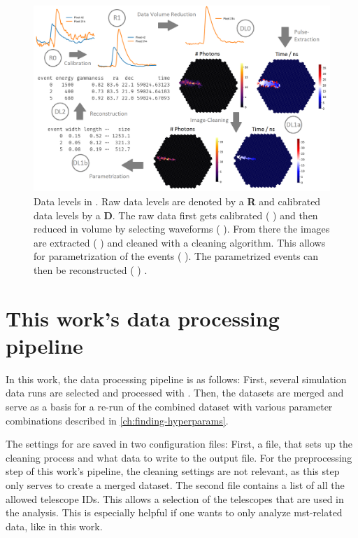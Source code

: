 \begin{figure}
    \centering
    \includegraphics[width=\textwidth]{graphics/ctapipe.png}
    \caption{Data levels in \ctapipe{}. Raw data levels are denoted by a \textbf{R} and calibrated
    data levels by a \textbf{D}. The raw data first gets calibrated (\rzero{} \rightarrow \rone{})
    and then reduced in volume by selecting waveforms (\rone{} \rightarrow \dlz{}). From there the
    images are extracted (\dlz{} \rightarrow \dloa{}) and cleaned with a cleaning algorithm. This
    allows for parametrization of the events (\dloa{} \rightarrow \dlob{}). The parametrized events
    can then be reconstructed (\dlob{} \rightarrow \dlt{}) \cite{noethe_thesis, hackfeld}.}
    \label{fig:ctapipe}
\end{figure}

\section{This work's data processing pipeline}
\label{sec:pipeline}
In this work, the data processing pipeline is as follows: First, several simulation data runs are
selected and processed with \ctapipe{}. Then, the datasets are merged and serve as a basis for a re-run
of the combined dataset with various parameter combinations described in \autoref{ch:finding-hyperparams}.

The settings for \ctapipe{} are saved in two configuration files: First, a file, that sets up the
cleaning process and what data to write to the output file. For the preprocessing step of this work's
pipeline, the cleaning settings are not relevant, as this step only serves to create a merged dataset.
The second file contains a list of all the allowed telescope IDs. This allows a selection of the telescopes
that are used in the analysis. This is especially helpful if one wants to only analyze \gls{mst}-related
data, like in this work.

